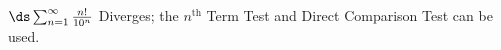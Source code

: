 {$\ds \sum_{n=1}^\infty \frac{n!}{10^n}$
}
{Diverges; the $n^\text{th}$ Term Test and Direct Comparison Test can be used.
}